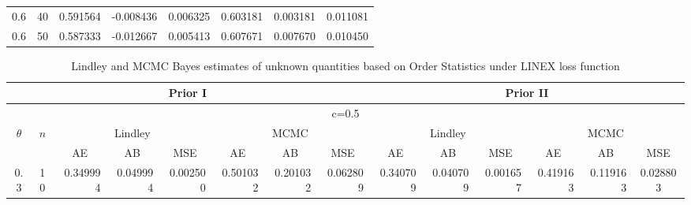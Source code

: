 \documentclass[11pt,a4paper]{article}
\numberwithin{equation}{section}
\begin{document}
\begin{table}[htbp]
\begin{tabular}{cc|ccc|ccc}
			0.6   & 40    & 0.591564 & -0.008436 & 0.006325 & 0.603181 & 0.003181 & 0.011081 \\

			0.6   & 50    & 0.587333 & -0.012667 & 0.005413 & 0.607671 & 0.007670 & 0.010450 \\

			\bottomrule

		\end{tabular}%

		\label{os.sel}%

	\end{table}%

	\begin{landscape}


		\begin{table}[htbp]

			\centering

			\caption{Lindley and MCMC Bayes estimates of unknown quantities based on Order Statistics under LINEX loss function}

			\begin{tabular}{cc|rrr|rrr|rrr|rrr}

				\toprule

				\multicolumn{8}{c|}{Prior I}                                  & \multicolumn{6}{c}{ Prior II} \\

				\midrule

				\multicolumn{14}{c}{                                      c=0.5} \\

				\midrule

				\multirow{2}[4]{*}{$\theta$} & \multirow{2}[4]{*}{$n$} & \multicolumn{3}{c|}{Lindley} & \multicolumn{3}{c|}{MCMC} & \multicolumn{3}{c|}{Lindley} & \multicolumn{3}{c}{MCMC} \\

				\cmidrule{3-14}           &       & \multicolumn{1}{c}{AE} & \multicolumn{1}{c}{AB} & \multicolumn{1}{c|}{MSE} & \multicolumn{1}{c}{AE} & \multicolumn{1}{c}{AB} & \multicolumn{1}{c|}{MSE} & \multicolumn{1}{c}{AE} & \multicolumn{1}{c}{AB} & \multicolumn{1}{c|}{MSE} & \multicolumn{1}{c}{AE} & \multicolumn{1}{c}{AB} & \multicolumn{1}{c}{MSE} \\

				\midrule

				0.3   & 10    & 0.349994 & 0.049994 & 0.002500 & 0.501032 & 0.201032 & 0.062809 & 0.340709 & 0.040709 & 0.001657 & 0.419163 & 0.119163 & \multicolumn{1}{c}{0.028803} \\


\end{tabular}
\end{table}
\end{landscape}
\end{document}
